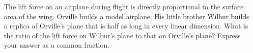 The lift force on an airplane during flight is directly proportional to the surface area of the wing. Orville builds a model airplane. His little brother Wilbur builds a replica of Orville's plane that is half as long in every linear dimension. What is the ratio of the lift force on Wilbur's plane to that on Orville's plane? Express your answer as a common fraction.
